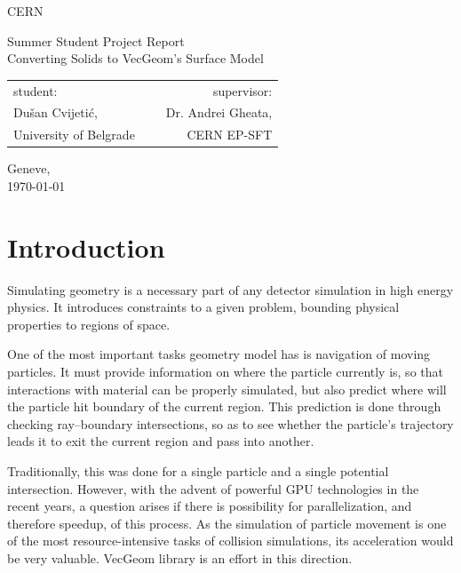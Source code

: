 \documentclass[12pt, a4paper]{article}
\begin{document}
	
\thispagestyle{empty}
{ \centering
	CERN
	\vspace*{0.5cm}
	
	\footnotesize
	Summer Student Project Report\\
	\huge
	{\sc Converting Solids to VecGeom's Surface Model}\\
	\vspace{0.4cm}
	\footnotesize
	\begin{tabular}{l c r}
		student: & \hspace{3cm}\ & supervisor:\\
		Dušan Cvijetić\footnotemark, && Dr. Andrei Gheata, \\
		\scriptsize University of Belgrade && \scriptsize CERN EP-SFT
	\end{tabular}
	
	\normalsize
	\vspace{0.5cm}
	Geneve,\\
	\today
		
	
}

\tableofcontents

\section{Introduction}

Simulating geometry is a necessary part of any detector simulation in high energy physics. It introduces constraints to a given problem, bounding physical properties to regions of space.

One of the most important tasks geometry model has is navigation of moving particles. It must provide information on where the particle currently is, so that interactions with material can be properly simulated, but also predict where will the particle hit boundary of the current region. This prediction is done through checking ray--boundary intersections, so as to see whether the particle's trajectory leads it to exit the current region and pass into another. \cite{Apostolakis_2018}

Traditionally, this was done for a single particle and a single potential intersection. However, with the advent of powerful GPU technologies in the recent years, a question arises if there is possibility for parallelization, and therefore speedup, of this process. As the simulation of particle movement is one of the most resource-intensive tasks of collision simulations, its acceleration would be very valuable. VecGeom library \cite{Apostolakis_2015} is an effort in this direction.
\end{document}
